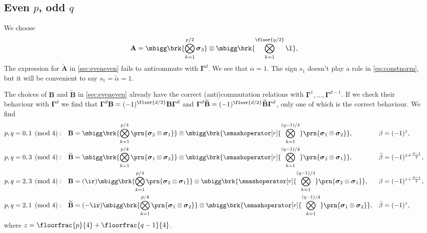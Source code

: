 \documentclass[11pt]{article}
\newcommand{\Gammab}{\boldsymbol{\Gamma}}
\newcommand{\A}{\mathbf{A}}
\newcommand{\B}{\mathbf{B}}
\newcommand{\At}{\widetilde{\A}}
\newcommand{\Bt}{\widetilde{\B}}
\newcommand{\sigmab}{\boldsymbol{\sigma}}
\newcommand{\alphat}{\tilde{\alpha}}
\newcommand{\betat}{\tilde{\beta}}
\begin{document}

\subsection{Even \texorpdfstring{$p$}{p}, odd \texorpdfstring{$q$}{q}}\label{sec:evenodd}

We choose
%
\begin{equation*}
  \A =  \mbigg\brk{\bigotimes_{k=1}^{{p/2}} \sigmab_3}
        \otimes \mbigg\brk{\bigotimes_{k=1}^{\floor{q/2}} \I},
\end{equation*}
%
The expression for $\At$ in \cref{sec:eveneven} fails to anticommute with $\Gammab^d$.
We see that $\alpha = 1$.
The sign $s_1$ doesn't play a role in \cref{eq:constnorm}, but it will be convenient to say $s_1 = \alphat = 1$.

The choices of $\B$ and $\Bt$ in \cref{sec:eveneven} already have the correct (anti)commutation relations with $\Gammab^1, \ldots, \Gammab^{d-1}$.
If we check their behaviour with $\Gammab^d$ we find that $\Gammab^d \B = (-1)^{\floor{d/2}}\B \Gammab^d$ and $\Gammab^d \Bt = (-1)^{\floor{d/2}}\Bt \Gammab^d$, only one of which is the correct behaviour.
We find
%
\begin{equation*}
\begin{aligned}
  p,q &= 0,1 \pmod 4: &
  \B &= \mbigg\brk{\bigotimes_{k=1}^{p/4}
        \prn{\sigmab_2 \otimes \sigmab_1}} \otimes
        \mbigg\brk{\smashoperator[r]{\bigotimes_{k=1}^{(q-1)/4}}
        \prn{\sigmab_1 \otimes \sigmab_2}}, &
  \beta &= (-1)^{z}, \\
  p,q &= 0,3 \pmod 4: &
  \Bt &= \mbigg\brk{\bigotimes_{k=1}^{p/4}
        \prn{\sigmab_1 \otimes \sigmab_2}} \otimes
        \mbigg\brk{\smashoperator[r]{\bigotimes_{k=1}^{(q-1)/4}}
        \prn{\sigmab_2 \otimes \sigmab_1}}, &
  \betat &= (-1)^{z + \frac{d-1}{2}}, \\
  p,q &= 2,3 \pmod 4: &
  \B &= (\ir)
        \mbigg\brk{\bigotimes_{k=1}^{p/4}
        \prn{\sigmab_2 \otimes \sigmab_1}} \otimes
        \mbigg\brk{\smashoperator[r]{\bigotimes_{k=1}^{(q-1)/4}}
        \prn{\sigmab_2 \otimes \sigmab_1}}, &
  \beta &= (-1)^{z + \frac{d-1}{2}}, \\
  p,q &= 2,1 \pmod 4: &
  \Bt &= (-\ir)
        \mbigg\brk{\bigotimes_{k=1}^{p/4}
        \prn{\sigmab_1 \otimes \sigmab_2}} \otimes
        \mbigg\brk{\smashoperator[r]{\bigotimes_{k=1}^{(q-1)/4}}
        \prn{\sigmab_1 \otimes \sigmab_2}}, &
  \betat &= (-1)^{z}, 
\end{aligned}
\end{equation*}
%
where \( z = \floorfrac{p}{4} + \floorfrac{q-1}{4}\).
\end{document}
